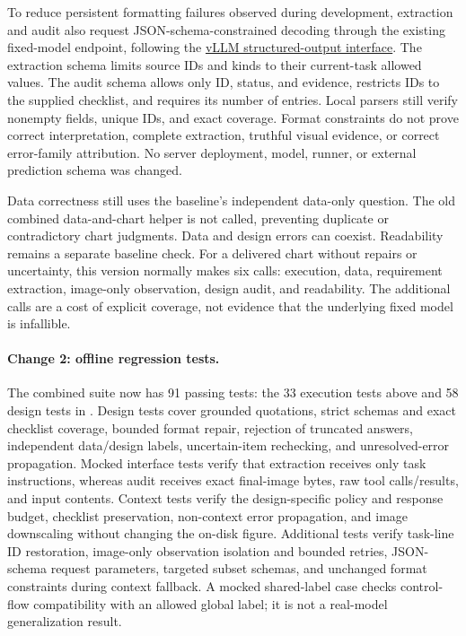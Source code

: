 \documentclass[11pt]{article}
\begin{document}
To reduce persistent formatting failures observed during development,
extraction and audit also request JSON-schema-constrained decoding through
the existing fixed-model endpoint, following the
\href{https://docs.vllm.ai/en/v0.15.0/features/structured_outputs/}
{vLLM structured-output interface}.
The extraction schema limits source IDs and kinds to their current-task
allowed values. The audit schema allows only ID, status, and evidence,
restricts IDs to the supplied checklist, and requires its number of entries.
Local parsers still verify nonempty fields, unique IDs, and exact coverage.
Format constraints do not prove correct interpretation, complete extraction,
truthful visual evidence, or correct error-family attribution.
No server deployment, model, runner, or external prediction schema was changed.

Data correctness still uses the baseline's independent data-only question.
The old combined data-and-chart helper is not called, preventing duplicate
or contradictory chart judgments. Data and design errors can coexist.
Readability remains a separate baseline check.
For a delivered chart without repairs or uncertainty, this version normally
makes six calls: execution, data, requirement extraction, image-only
observation, design audit, and readability.
The additional calls are a cost of explicit coverage, not evidence
that the underlying fixed model is infallible.

\paragraph{Change 2: offline regression tests.}
The combined suite now has 91 passing tests: the 33 execution tests above
and 58 design tests in .
Design tests cover grounded quotations, strict schemas and exact checklist
coverage, bounded format repair, rejection of truncated answers, independent
data/design labels, uncertain-item rechecking, and unresolved-error propagation.
Mocked interface tests verify that extraction receives only task instructions,
whereas audit receives exact final-image bytes, raw tool calls/results, and
input contents. Context tests verify the design-specific policy and response
budget, checklist preservation, non-context error propagation, and image
downscaling without changing the on-disk figure.
Additional tests verify task-line ID restoration, image-only observation
isolation and bounded retries, JSON-schema request parameters, targeted
subset schemas, and unchanged format constraints during context fallback.
A mocked shared-label case checks control-flow compatibility with an
allowed global label; it is not a real-model generalization result.
\end{document}
